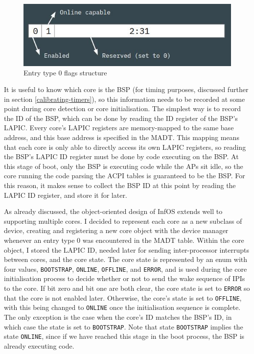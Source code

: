 \documentclass[bsc,frontabs,singlespacing,parskip,deptreport]{infthesis}     %
\begin{document}
\begin{figure}[h]
    \centering
    \includegraphics[scale=0.6]{figures/entry0flags.jpg}
    \caption{Entry type 0 flags structure}
    \label{entry0flags}
\end{figure}

It is useful to know which core is the BSP (for timing purposes, discussed further in section \ref{calibrating-timers}), so this information needs to be recorded at some point during core detection or core initialisation. The simplest way is to record the ID of the BSP, which can be done by reading the ID register of the BSP's LAPIC. Every core's LAPIC registers are memory-mapped to the same base address, and this base address is specified in the MADT. This mapping means that each core is only able to directly access its own LAPIC registers, so reading the BSP's LAPIC ID register must be done by code executing on the BSP. At this stage of boot, only the BSP is executing code while the APs sit idle, so the core running the code parsing the ACPI tables is guaranteed to be the BSP. For this reason, it makes sense to collect the BSP ID at this point by reading the LAPIC ID register, and store it for later.

As already discussed, the object-oriented design of InfOS extends well to supporting multiple cores. I decided to represent each core as a new subclass of device, creating and registering a new core object with the device manager whenever an entry type 0 was encountered in the MADT table. Within the core object, I stored the LAPIC ID, needed later for sending inter-processor interrupts between cores, and the core state. The core state is represented by an enum with four values, \verb|BOOTSTRAP|, \verb|ONLINE|, \verb|OFFLINE|, and \verb|ERROR|, and is used during the core initialisation process to decide whether or not to send the wake sequence of IPIs to the core. If bit zero and bit one are both clear, the core state is set to \verb|ERROR| so that the core is not enabled later. Otherwise, the core's state is set to \verb|OFFLINE|, with this being changed to \verb|ONLINE| once the initialisation sequence is complete. The only exception is the case when the core's ID matches the BSP's ID, in which case the state is set to \verb|BOOTSTRAP|. Note that state \verb|BOOTSTRAP| implies the state \verb|ONLINE|, since if we have reached this stage in the boot process, the BSP is already executing code.
\end{document}

